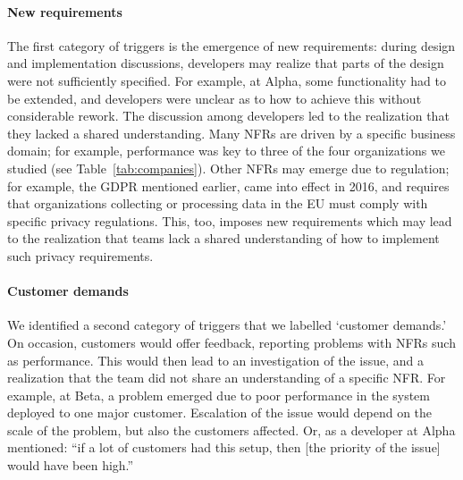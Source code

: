 \documentclass[smallextended]{svjour3}
\begin{document}
\paragraph{New requirements} The first category of triggers is the emergence of new requirements: during design and implementation discussions, developers may realize that parts of the design were not sufficiently specified. For example, at Alpha, some functionality had to be extended, and developers were unclear as to how to achieve this without considerable rework. The discussion among developers led to the realization that they lacked a shared understanding.
Many NFRs are driven by a specific business domain; for example, performance was key to three of the four organizations we studied (see Table~\ref{tab:companies}). Other NFRs may emerge due to regulation; for example, the 
GDPR mentioned earlier, came into effect in 2016, and requires that organizations collecting or processing data in the EU must comply with specific privacy regulations. This, too, imposes new requirements which may lead to the realization that teams lack a shared understanding of how to implement such privacy requirements.

\paragraph{Customer demands} We identified a second category of triggers that we labelled `customer demands.' On occasion, customers would offer feedback, reporting problems with NFRs such as performance. This would then lead to an investigation of the issue, and a realization that the team did not share an understanding of a specific NFR.  For example, at Beta, a problem emerged due to poor performance in the system deployed to one major customer. Escalation of the issue would depend on the scale of the problem, but also the customers affected. Or, as a developer at Alpha mentioned: \textmd{``if a lot of customers had this setup, then [the priority of the issue] would have been high.''}
\end{document}
